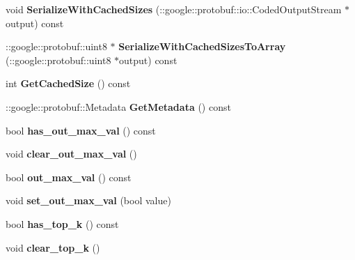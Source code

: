 \begin{DoxyCompactItemize}
void {\bfseries Serialize\+With\+Cached\+Sizes} (\+::google\+::protobuf\+::io\+::\+Coded\+Output\+Stream $\ast$output) const
\item 
\mbox{\label{classcaffe_1_1_arg_max_parameter_aeaf7977f0510f7e70866abe63fe5ecb8}} 
\+::google\+::protobuf\+::uint8 $\ast$ {\bfseries Serialize\+With\+Cached\+Sizes\+To\+Array} (\+::google\+::protobuf\+::uint8 $\ast$output) const
\item 
\mbox{\label{classcaffe_1_1_arg_max_parameter_a11a6ef12e2ed3becd44b8829022122f4}} 
int {\bfseries Get\+Cached\+Size} () const
\item 
\mbox{\label{classcaffe_1_1_arg_max_parameter_a1f864ca3730d5527a1f1688dce25ec01}} 
\+::google\+::protobuf\+::\+Metadata {\bfseries Get\+Metadata} () const
\item 
\mbox{\label{classcaffe_1_1_arg_max_parameter_a9090dab48b4cf0edfe25986d42990fe3}} 
bool {\bfseries has\+\_\+out\+\_\+max\+\_\+val} () const
\item 
\mbox{\label{classcaffe_1_1_arg_max_parameter_a5e2fb2d5047751711be42f33f20735ed}} 
void {\bfseries clear\+\_\+out\+\_\+max\+\_\+val} ()
\item 
\mbox{\label{classcaffe_1_1_arg_max_parameter_a7feccb367284ebc64baffa8021f93739}} 
bool {\bfseries out\+\_\+max\+\_\+val} () const
\item 
\mbox{\label{classcaffe_1_1_arg_max_parameter_aaed7c9289060a53407838d56ef3bdda1}} 
void {\bfseries set\+\_\+out\+\_\+max\+\_\+val} (bool value)
\item 
\mbox{\label{classcaffe_1_1_arg_max_parameter_a1343bc4636a565edf84ebfbc28a0d919}} 
bool {\bfseries has\+\_\+top\+\_\+k} () const
\item 
\mbox{\label{classcaffe_1_1_arg_max_parameter_ada50bf5d66424c96020ead3e372275ff}} 
void {\bfseries clear\+\_\+top\+\_\+k} ()
\item 

\end{DoxyCompactItemize}
